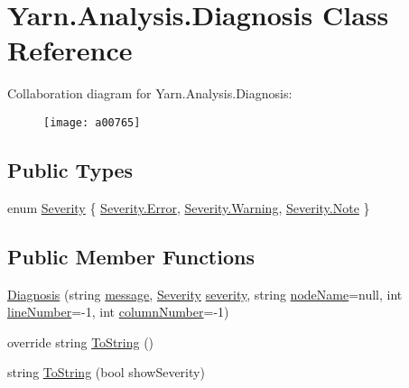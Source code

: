 \hypertarget{a00091}{\section{Yarn.\-Analysis.\-Diagnosis Class Reference}
\label{a00091}
}


Collaboration diagram for Yarn.\-Analysis.\-Diagnosis\-:
\nopagebreak
\begin{figure}[H]
\begin{center}
\leavevmode
\texttt{[image: a00765]}
\end{center}
\end{figure}
\subsection*{Public Types}
\begin{DoxyCompactItemize}
\item 
enum \hyperlink{a00091_a227813cbc8fa03c3448a612ffc909d1c}{Severity} \{ \hyperlink{a00091_a227813cbc8fa03c3448a612ffc909d1ca902b0d55fddef6f8d651fe1035b7d4bd}{Severity.\-Error}, 
\hyperlink{a00091_a227813cbc8fa03c3448a612ffc909d1ca0eaadb4fcb48a0a0ed7bc9868be9fbaa}{Severity.\-Warning}, 
\hyperlink{a00091_a227813cbc8fa03c3448a612ffc909d1ca3b0649c72650c313a357338dcdfb64ec}{Severity.\-Note}
 \}
\end{DoxyCompactItemize}
\subsection*{Public Member Functions}
\begin{DoxyCompactItemize}
\item 
\hyperlink{a00091_ad3fd818f1be98dc803e5bec959153824}{Diagnosis} (string \hyperlink{a00091_ac7ed070dddd2613c08e7874ea5afb3af}{message}, \hyperlink{a00091_a227813cbc8fa03c3448a612ffc909d1c}{Severity} \hyperlink{a00091_ad90ffa839ce0f568a099bb37b4a6c4da}{severity}, string \hyperlink{a00091_a662aca4ad2af5116c2cf6773daf1a847}{node\-Name}=null, int \hyperlink{a00091_a0bd73f1c684bfd66ae7b6bef8f2972d0}{line\-Number}=-\/1, int \hyperlink{a00091_a658e7fb05555c0f9ab5f80057bdc1408}{column\-Number}=-\/1)
\item 
override string \hyperlink{a00091_a4475eb5890c340da5c0012e25c2c86ae}{To\-String} ()
\item 
string \hyperlink{a00091_a985dee7ca27aa896332590133606b6a9}{To\-String} (bool show\-Severity)
\end{DoxyCompactItemize}
